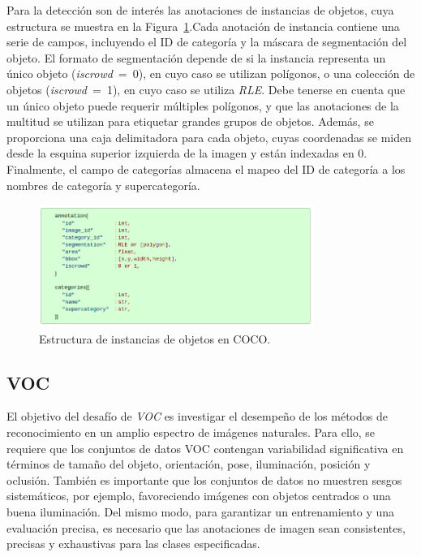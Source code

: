 Para la detección son de interés las anotaciones de instancias de objetos, cuya estructura se muestra en la Figura~\ref{fig.objInst}.Cada anotación de instancia contiene una serie de campos, incluyendo el ID de categoría y la máscara de segmentación del objeto. El formato de segmentación depende de si la instancia representa un único objeto (\textit{iscrowd}~=~0), en cuyo caso se utilizan polígonos, o una colección de objetos (\textit{iscrowd}~=~1), en cuyo caso se utiliza \textit{\ac{RLE}}. Debe tenerse en cuenta que un único objeto puede requerir múltiples polígonos, y que las anotaciones de la multitud se utilizan para etiquetar grandes grupos de objetos. Además, se proporciona una caja delimitadora para cada objeto, cuyas coordenadas se miden desde la esquina superior izquierda de la imagen y están indexadas en 0. Finalmente, el campo de categorías  almacena el mapeo del ID de categoría a los nombres de categoría y supercategoría.

\begin{figure}[H]
	\begin{center}
		\includegraphics[width=0.8\textwidth]{figures/instancia_objetos.png}
		\caption{Estructura de instancias de objetos en \ac{COCO}.}
		\label{fig.objInst}
	\end{center}
\end{figure}

\subsection{VOC}
El objetivo del desafío de \textit{\ac{VOC}} \cite{Everingham10} es investigar el desempeño de los métodos de reconocimiento en un amplio espectro de imágenes naturales. Para ello, se requiere que los conjuntos de datos \ac{VOC} contengan variabilidad significativa en términos de tamaño del objeto, orientación, pose, iluminación, posición y oclusión. También es importante que los conjuntos de datos no muestren sesgos sistemáticos, por ejemplo, favoreciendo imágenes con objetos centrados o una buena iluminación. Del mismo modo, para garantizar un entrenamiento y una evaluación precisa, es necesario que las anotaciones de imagen sean consistentes, precisas y exhaustivas para las clases especificadas.\\

